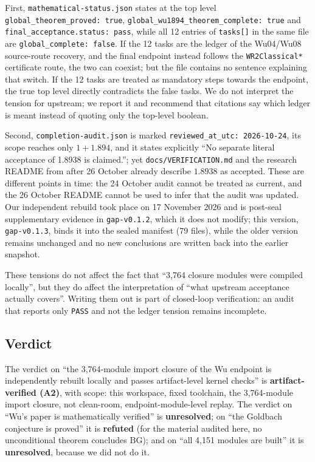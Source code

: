 \documentclass[11pt,a4paper]{article}
\theoremstyle{plain}
\theoremstyle{definition}
\newcommand{\BG}{\mathrm{BG}}
\begin{document}
{\raggedright
First, \texttt{mathematical-status.json} states at the top level \texttt{global\_theorem\_proved: true}, \texttt{global\_wu1894\_theorem\_complete: true} and \texttt{final\_acceptance.status: pass}, while all 12 entries of \texttt{tasks[]} in the same file are \texttt{global\_complete: false}. If the 12 tasks are the ledger of the Wu04/Wu08 source-route recovery, and the final endpoint instead follows the \texttt{WR2Classical*} certificate route, the two can coexist; but the file contains no sentence explaining that switch. If the 12 tasks are treated as mandatory steps towards the endpoint, the true top level directly contradicts the false tasks. We do not interpret the tension for upstream; we report it and recommend that citations say which ledger is meant instead of quoting only the top-level boolean.
\par}

{\raggedright
Second, \texttt{completion-audit.json} is marked \texttt{reviewed\_at\_utc: 2026-10-24}, its scope reaches only $1+1.894$, and it states explicitly ``No separate literal acceptance of 1.8938 is claimed.''; yet \texttt{docs/VERIFICATION.md} and the research README from after 26 October already describe $1.8938$ as accepted. These are different points in time: the 24 October audit cannot be treated as current, and the 26 October README cannot be used to infer that the audit was updated. Our independent rebuild took place on 17 November 2026 and is post-seal supplementary evidence in \texttt{gap-v0.1.2}, which it does not modify; this version, \texttt{gap-v0.1.3}, binds it into the sealed manifest (79 files), while the older version remains unchanged and no new conclusions are written back into the earlier snapshot.
\par}

These tensions do not affect the fact that ``3,764 closure modules were compiled locally'', but they do affect the interpretation of ``what upstream acceptance actually covers''. Writing them out is part of closed-loop verification: an audit that reports only \texttt{PASS} and not the ledger tension remains incomplete.

\subsection{Verdict}
\label{sec:wu-verdict}

The verdict on ``the 3,764-module import closure of the Wu endpoint is independently rebuilt locally and passes artifact-level kernel checks'' is \textbf{artifact-verified (A2)}, with scope: this workspace, fixed toolchain, the 3,764-module import closure, not clean-room, endpoint-module-level replay. The verdict on ``Wu's paper is mathematically verified'' is \textbf{unresolved}; on ``the Goldbach conjecture is proved'' it is \textbf{refuted} (for the material audited here, no unconditional theorem concludes $\BG$); and on ``all 4,151 modules are built'' it is \textbf{unresolved}, because we did not do it.
\end{document}
